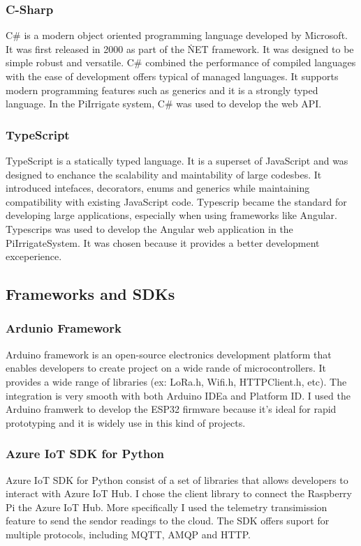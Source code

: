 \subsubsection{C-Sharp}
C\# is a modern object oriented programming language developed by Microsoft. It was first released in 2000 as part of the \.NET framework.
It was designed to be simple robust and versatile. C\# combined the performance of compiled languages with the ease of development offers
typical of managed languages. It supports modern programming features such as generics and it is a strongly typed language\cite{dotnet_official}\cite{microsoft_csharp}.
In the PiIrrigate system, C\# was used to develop the web API.

\subsubsection{TypeScript}
TypeScript is a statically typed language. It is a superset of JavaScript and was designed to enchance the scalability and maintability of large codesbes.
It introduced intefaces, decorators, enums and generics while maintaining compatibility with existing JavaScript code. Typescrip became
the standard for developing large applications, especially when using frameworks like Angular. Typescrips was used to develop the Angular
web application in the PiIrrigateSystem. It was chosen because it provides a better development exceperience.

\subsection{Frameworks and SDKs}
\subsubsection{Ardunio Framework}
Arduino framework is an open-source electronics development platform that enables developers to create project on a wide rande of microcontrollers.
It provides a wide range of libraries (ex: LoRa.h, Wifi.h, HTTPClient.h, etc). The integration is very smooth with both Arduino IDEa and Platform ID.
I used the Arduino framwerk to develop the ESP32 firmware because it's ideal for rapid prototyping and it is widely use in this kind of projects\cite{arduino_core}.

\subsubsection{Azure IoT SDK for Python}
Azure IoT SDK for Python consist of a set of libraries that allows developers to interact with Azure IoT Hub. I chose the client
library to connect the Raspberry Pi the Azure IoT Hub. More specifically I used the telemetry transimission feature to send the sendor readings 
to the cloud. The SDK offers suport for multiple protocols, including MQTT, AMQP and HTTP\cite{azure_iot_hub_docs}\cite{azure_iot_sdk_python}.

